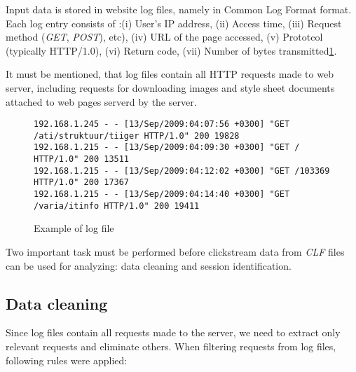 \documentclass[english,a4paper]{article}
\begin{document}
Input data is stored in website log files, namely in Common Log Format\cite{ref_clf} format. Each log entry consists of :(i) User's IP address, (ii) Access time, (iii) Request method (\emph{GET}, \emph{POST}), etc), (iv) URL of the page accessed, (v) Prototcol (typically HTTP/1.0), (vi) Return code, (vii) Number of bytes transmitted\ref{log_sample}.

It must be mentioned, that log files contain all HTTP requests made to web server, including requests for downloading images and style sheet documents attached to web pages serverd by the server.

\begin{figure}[h]
{\tiny
\begin{verbatim}
192.168.1.245 - - [13/Sep/2009:04:07:56 +0300] "GET /ati/struktuur/tiiger HTTP/1.0" 200 19828
192.168.1.215 - - [13/Sep/2009:04:09:30 +0300] "GET / HTTP/1.0" 200 13511
192.168.1.215 - - [13/Sep/2009:04:12:02 +0300] "GET /103369 HTTP/1.0" 200 17367
192.168.1.215 - - [13/Sep/2009:04:14:40 +0300] "GET /varia/itinfo HTTP/1.0" 200 19411
\end{verbatim}
}
\label{log_sample}
\caption{Example of log file}
\end{figure}

Two important task must be performed before clickstream data from \emph{CLF} files can be used for analyzing: data cleaning and session identification.









\subsection{Data cleaning}
Since log files contain all requests made to the server, we need to extract only relevant requests and eliminate others. When filtering requests from log files, following rules were applied:
\end{document}
